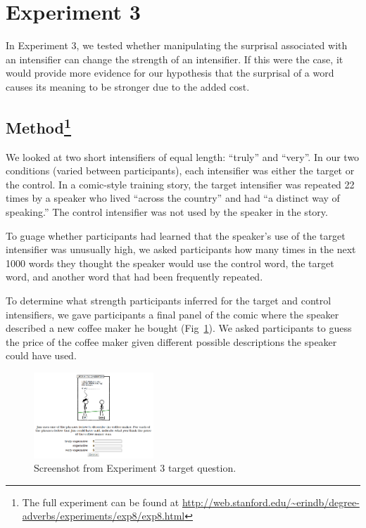 \documentclass[10pt,letterpaper]{article}
\begin{document}
\section{Experiment 3}

In Experiment 3, we tested whether manipulating the surprisal associated with an intensifier can change the strength of an intensifier. If this were the case, it would provide more evidence for our hypothesis that the surprisal of a word causes its meaning to be stronger due to the added cost.

\subsection{Method\footnote{The full experiment can be found at \url{http://web.stanford.edu/~erindb/degree-adverbs/experiments/exp8/exp8.html}}}

We looked at two short intensifiers of equal length: ``truly'' and ``very''. In our two conditions (varied between participants), each intensifier was either the target or the control. In a comic-style training story, the target intensifier was repeated 22 times by a speaker who lived ``across the country'' and had ``a distinct way of speaking.'' The control intensifier was not used by the speaker in the story.

To guage whether participants had learned that the speaker's use of the target intensifier was unusually high, we asked participants how many times in the next 1000 words they thought the speaker would use the control word, the target word, and another word that had been frequently repeated.

To determine what strength participants inferred for the target and control intensifiers, we gave participants a final panel of the comic where the speaker described a new coffee maker he bought (Fig~\ref{exp3-q}). We asked participants to guess the price of the coffee maker given different possible descriptions the speaker could have used.

\begin{figure}[ht]
\begin{center}
\includegraphics[width=0.4\textwidth]{analysis_files_for_writeup/images/exp3-q.png}
\end{center}
\caption{Screenshot from Experiment 3 target question.} 
\label{exp3-q}
\end{figure}
\end{document}
